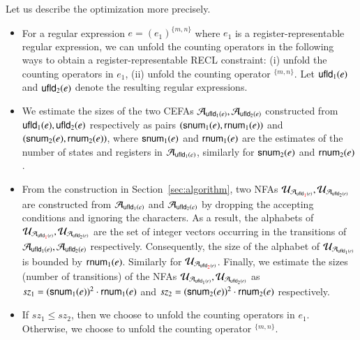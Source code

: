 Let us describe the optimization more precisely. 
\begin{itemize}
\item For a regular expression $e = (e_1)^{\{m,n\}}$ where $e_1$ is a register-representable regular expression, we can unfold the counting operators in the following ways to obtain a register-representable RECL constraint: (i) unfold the counting operators in $e_1$, (ii) unfold the counting operator $^{\{m,n\}}$. 
%
Let ${\sf ufld}_1(e)$ and ${\sf ufld}_2(e)$ denote the resulting regular expressions. 

\item We estimate the sizes of the two CEFAs $\mathcal{A}_{{\sf ufld}_1(e)}, \mathcal{A}_{{\sf ufld}_2(e)}$ constructed from ${\sf ufld}_1(e), {\sf ufld}_2(e)$ respectively as pairs $({\sf snum}_1(e), {\sf rnum}_1(e))$ and $({\sf snum}_2(e), {\sf rnum}_2(e))$, where ${\sf snum}_1(e)$ and ${\sf rnum}_1(e)$ are the estimates of the number of states and registers in $\mathcal{A}_{{\sf ufld}_1(e)}$, similarly for ${\sf snum}_2(e)$ and ${\sf rnum}_2(e)$. 
%
\item From the construction in Section~\ref{sec:algorithm}, 
two NFAs $\mathcal{U}_{\mathcal{A}_{{\sf ufld}_{\color{red}1\color{black}}(e)}}, \mathcal{U}_{\mathcal{A}_{{\sf ufld}_2(e)}}$ are constructed from $\mathcal{A}_{{\sf ufld}_1(e)}$ and $\mathcal{A}_{{\sf ufld}_2(e)}$ by dropping the accepting conditions and ignoring the characters. As a result, the alphabets of $\mathcal{U}_{\mathcal{A}_{{\sf ufld}_{\color{red}1\color{black}}(e)}}, \mathcal{U}_{\mathcal{A}_{{\sf ufld}_2(e)}}$ are the set of integer vectors occurring in the transitions of $\mathcal{A}_{{\sf ufld}_1(e)}, \mathcal{A}_{{\sf ufld}_2(e)}$ respectively.  Consequently, the size of the alphabet of $\mathcal{U}_{\mathcal{A}_{{\sf ufld}_1(e)}}$ is bounded by ${\sf rnum}_1(e)$. Similarly for $\mathcal{U}_{\mathcal{A}_{{\sf ufld}_{\color{red}2\color{black}}(e)}}$. 
Finally, we estimate the sizes (number of transitions) of the NFAs $\mathcal{U}_{\mathcal{A}_{{\sf ufld}_1(e)}}, \mathcal{U}_{\mathcal{A}_{{\sf ufld}_2(e)}}$ as $sz_1 = ({\sf snum}_1(e))^2 \cdot {\sf rnum}_1(e)$ and $sz_2 = ({\sf snum}_2(e))^2 \cdot {\sf rnum}_2(e)$ respectively. 
%
\item If $sz_1 \le sz_2$, then we choose to unfold the counting operators in $e_1$. Otherwise, we choose to unfold the counting operator $^{\{m,n\}}$. 
\end{itemize}

